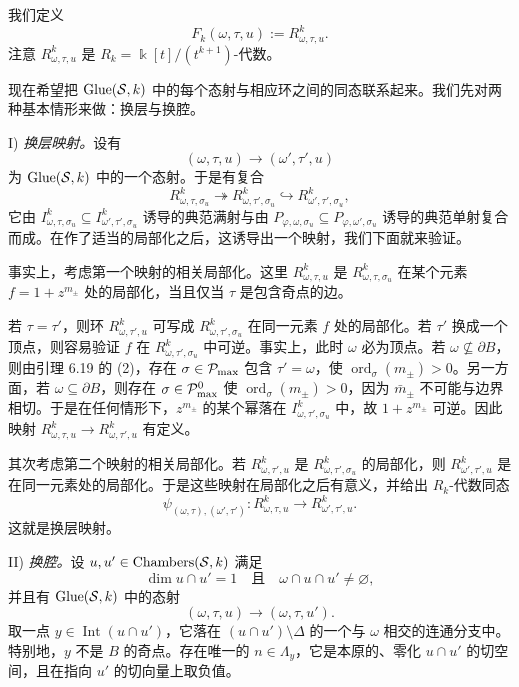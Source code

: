 我们定义
\[
  F_k(\omega,\tau,u):=R^k_{\omega,\tau,u}.
\]
注意 $R^k_{\omega,\tau,u}$ 是 $R_k=\Bbbk[t]/(t^{k+1})$-代数。


现在希望把 $\operatorname{Glue}(\mathcal{S},k)$ 中的每个态射与相应环之间的同态联系起来。我们先对两种基本情形来做：换层与换腔。

I) \emph{换层映射。}设有
\[
  (\omega,\tau,u)\to(\omega',\tau',u)
\]
为 $\operatorname{Glue}(\mathcal{S},k)$ 中的一个态射。于是有复合
\[
  R^k_{\omega,\tau,\sigma_u}\twoheadrightarrow R^k_{\omega,\tau',\sigma_u}
  \hookrightarrow R^k_{\omega',\tau',\sigma_u},
\]
它由 $I^k_{\omega,\tau,\sigma_u}\subseteq I^k_{\omega',\tau',\sigma_u}$ 诱导的典范满射与由 $P_{\varphi,\omega,\sigma_u}\subseteq P_{\varphi,\omega',\sigma_u}$ 诱导的典范单射复合而成。在作了适当的局部化之后，这诱导出一个映射，我们下面就来验证。

事实上，考虑第一个映射的相关局部化。这里 $R^k_{\omega,\tau,u}$ 是 $R^k_{\omega,\tau,\sigma_u}$ 在某个元素 $f=1+z^{m_\pm}$ 处的局部化，当且仅当 $\tau$ 是包含奇点的边。

若 $\tau=\tau'$，则环 $R^k_{\omega,\tau',u}$ 可写成 $R^k_{\omega,\tau',\sigma_u}$ 在同一元素 $f$ 处的局部化。若 $\tau'$ 换成一个顶点，则容易验证 $f$ 在 $R^k_{\omega,\tau',\sigma_u}$ 中可逆。事实上，此时 $\omega$ 必为顶点。若 $\omega\not\subseteq\partial B$，则由引理 6.19 的 (2)，存在 $\sigma\in\mathcal{P}_{\max}$ 包含 $\tau'=\omega$，使 $\operatorname{ord}_\sigma(m_\pm)>0$。另一方面，若 $\omega\subseteq\partial B$，则存在 $\sigma\in\mathcal{P}^0_{\max}$ 使 $\operatorname{ord}_\sigma(m_\pm)>0$，因为 $\bar m_\pm$ 不可能与边界相切。于是在任何情形下，$z^{m_\pm}$ 的某个幂落在 $I^k_{\omega,\tau',\sigma_u}$ 中，故 $1+z^{m_\pm}$ 可逆。因此映射 $R^k_{\omega,\tau,u}\to R^k_{\omega,\tau',u}$ 有定义。

其次考虑第二个映射的相关局部化。若 $R^k_{\omega,\tau',u}$ 是 $R^k_{\omega,\tau',\sigma_u}$ 的局部化，则 $R^k_{\omega',\tau',u}$ 是在同一元素处的局部化。于是这些映射在局部化之后有意义，并给出 $R_k$-代数同态
\[
  \psi_{(\omega,\tau),(\omega',\tau')}:R^k_{\omega,\tau,u}\to R^k_{\omega',\tau',u}.
\]
这就是换层映射。

II) \emph{换腔。}设 $u,u'\in\operatorname{Chambers}(\mathcal{S},k)$ 满足
\[
  \dim u\cap u'=1\quad\text{且}\quad \omega\cap u\cap u'\ne\varnothing,
\]
并且有 $\operatorname{Glue}(\mathcal{S},k)$ 中的态射
\[
  (\omega,\tau,u)\to(\omega,\tau,u').
\]
取一点 $y\in\operatorname{Int}(u\cap u')$，它落在 $(u\cap u')\setminus\Delta$ 的一个与 $\omega$ 相交的连通分支中。特别地，$y$ 不是 $B$ 的奇点。存在唯一的 $n\in\Lambda_y$，它是本原的、零化 $u\cap u'$ 的切空间，且在指向 $u'$ 的切向量上取负值。

